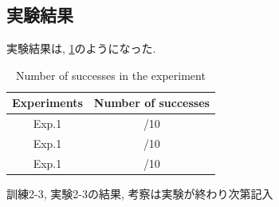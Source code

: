 \subsection{実験結果}
実験結果は, \ref{tb:exp4}のようになった. 

\begin{table}[h]
  \centering
  \begin{tabular}{|c|c|} \hline
    Experiments & Number of successes \\ \hline
    Exp.1 & /10 \\ \hline
    Exp.1 & /10 \\ \hline
    Exp.1 & /10 \\ \hline
  \end{tabular}
  \caption{Number of successes in the experiment}
  \label{tb:exp4}
\end{table}

訓練2-3, 実験2-3の結果, 考察は実験が終わり次第記入